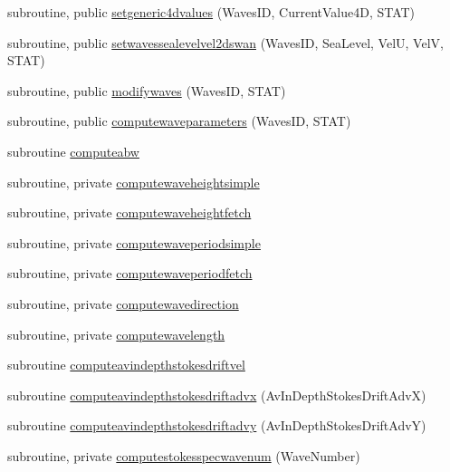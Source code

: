 \begin{DoxyCompactItemize}
\item 
subroutine, public \mbox{\hyperlink{namespacemodulewaves_a27286ddaee0e46cf76c86b80a35ee9ad}{setgeneric4dvalues}} (Waves\+ID, Current\+Value4D, S\+T\+AT)
\item 
subroutine, public \mbox{\hyperlink{namespacemodulewaves_aa5ff8156c82807bd7134751bf6b90824}{setwavessealevelvel2dswan}} (Waves\+ID, Sea\+Level, VelU, VelV, S\+T\+AT)
\item 
subroutine, public \mbox{\hyperlink{namespacemodulewaves_ad08ecc5e93cabd5c4b166e1af608e044}{modifywaves}} (Waves\+ID, S\+T\+AT)
\item 
subroutine, public \mbox{\hyperlink{namespacemodulewaves_a6a63e2ee3bdd7ee4378a33408a4668a7}{computewaveparameters}} (Waves\+ID, S\+T\+AT)
\item 
subroutine \mbox{\hyperlink{namespacemodulewaves_a3aa2de7449377be15fcc0bbb463170ed}{computeabw}}
\item 
subroutine, private \mbox{\hyperlink{namespacemodulewaves_af86c07d276fd3f5fe89a2adc94d0518f}{computewaveheightsimple}}
\item 
subroutine, private \mbox{\hyperlink{namespacemodulewaves_a13f51790900a5a9f5a5b30632d881229}{computewaveheightfetch}}
\item 
subroutine, private \mbox{\hyperlink{namespacemodulewaves_a8fac90eb88cf4a39a40d63dbc040c2fa}{computewaveperiodsimple}}
\item 
subroutine, private \mbox{\hyperlink{namespacemodulewaves_abd3acb5aa4305dcf02b29e94c10a666f}{computewaveperiodfetch}}
\item 
subroutine, private \mbox{\hyperlink{namespacemodulewaves_ad48d7252dffb5d91c6b1bd578279b9f6}{computewavedirection}}
\item 
subroutine, private \mbox{\hyperlink{namespacemodulewaves_acea107970c1ba41962a9affab7ff313a}{computewavelength}}
\item 
subroutine \mbox{\hyperlink{namespacemodulewaves_ad23198cd88a84595114e626504892d21}{computeavindepthstokesdriftvel}}
\item 
subroutine \mbox{\hyperlink{namespacemodulewaves_a98626046a012cf7b692f0a35191e231e}{computeavindepthstokesdriftadvx}} (Av\+In\+Depth\+Stokes\+Drift\+AdvX)
\item 
subroutine \mbox{\hyperlink{namespacemodulewaves_a2c6ef8f51e579b38f56e8b4ec076f0aa}{computeavindepthstokesdriftadvy}} (Av\+In\+Depth\+Stokes\+Drift\+AdvY)
\item 
subroutine, private \mbox{\hyperlink{namespacemodulewaves_ad109b1bb3a215d9d37fee5e04428decc}{computestokesspecwavenum}} (Wave\+Number)

\end{DoxyCompactItemize}
